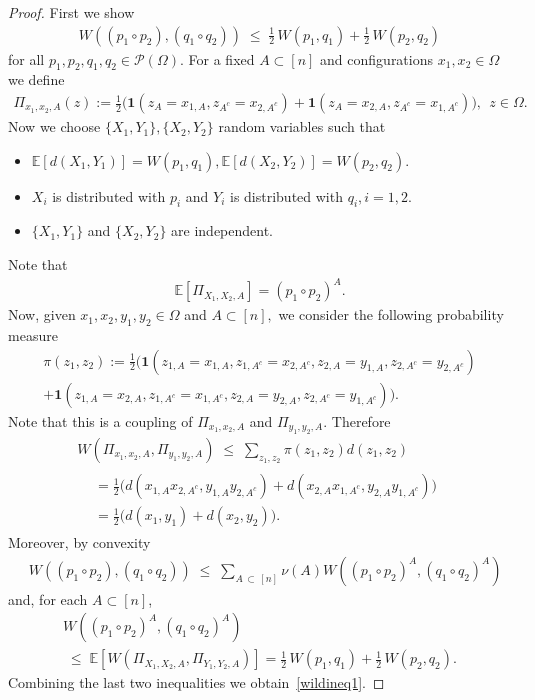 \documentclass[10pt,a4paper]{article}
\renewcommand{\leq}{\;\leqslant\;}
\newcommand{\Om}{\Omega}
\newcommand{\IND}{\mathbf{1}}
\newcommand{\cP}{\mathcal{P}}
\newcommand{\bbE}{\mathbb{E}}
\let\O=\Omega
\begin{document}
\begin{proof}
First we show
\begin{align}\label{wildineq1}
W\left((p_1 \circ p_2),(q_1 \circ q_2)\right)\leq \tfrac{1}{2}\,W\left(p_1,q_1\right) + \tfrac{1}{2}\,W\left(p_2,q_2\right)
\end{align}
for all $p_1,p_2,q_1,q_2 \in \cP(\O).$ For a fixed $A \subset [n]$ and configurations $x_1, x_2 \in \Om$ we define
\begin{align*}
\Pi_{x_1,x_2,A}(z) := \tfrac{1}{2}\big(\IND(z_A = x_{1,A}, z_{A^c}=x_{2,A^c})+\IND(z_A = x_{2,A}, z_{A^c}=x_{1,A^c})\big), \ \ z \in \Om.
\end{align*}
Now we choose $\{X_1,Y_1\}, \{X_2,Y_2\}$ random variables such that
\begin{itemize}
\item $\bbE[d(X_1,Y_1)] = W(p_1,q_1), \bbE[d(X_2,Y_2)] = W(p_2,q_2).$
\item $X_i$ is distributed with $p_i$ and $Y_i$ is distributed with $q_i, i=1,2.$
\item $\{X_1, Y_1\}$ and $\{X_2, Y_2\}$ are independent.
\end{itemize}
Note that
\begin{align}
\bbE\left[\Pi_{X_1,X_2,A}\right] = \left(p_1 \circ p_2\right)^A.
\end{align}
Now, given $x_1, x_2, y_1, y_2 \in \Om$ and $A \subset [n],$ we consider the following probability measure
\begin{multline*}
\pi(z_1,z_2):= \tfrac{1}{2}\big(\IND(z_{1,A}=x_{1,A}, z_{1,A^c}=x_{2,A^c},z_{2,A}=y_{1,A}, z_{2,A^c}=y_{2,A^c}) \\
 + \IND(z_{1,A}=x_{2,A},z_{1,A^c}=x_{1,A^c},z_{2,A}=y_{2,A}, z_{2,A^c}=y_{1,A^c})\big).
\end{multline*}
Note that this is a coupling of $\Pi_{x_1,x_2,A}$ and $\Pi_{y_1,y_2,A}.$ Therefore
\begin{multline} \label{wassineq}
W\left(\Pi_{x_1,x_2,A},\Pi_{y_1,y_2,A}\right)\leq \sum_{z_1,z_2}\pi(z_1,z_2)d(z_1,z_2)\\
\begin{aligned}
&=\tfrac{1}{2}\big(d(x_{1,A}x_{2,A^c},y_{1,A}y_{2,A^c})+d(x_{2,A}x_{1,A^c},y_{2,A}y_{1,A^c})\big) \\
&=\tfrac{1}{2}\big(d(x_1,y_1)+d(x_2,y_2)\big).
\end{aligned}
\end{multline}
Moreover, by convexity
\begin{align}
&W\left((p_1\circ p_2),(q_1 \circ q_2)\right) \leq \sum_{A\,\subset\,[n]}\nu(A)W\left((p_1\circ p_2)^A,(q_1 \circ q_2)^A\right)
\end{align}
and, for each $A \subset [n]$,
\begin{multline}\label{wildineq1overA}
W\left((p_1\circ p_2)^A,(q_1 \circ q_2)^A\right) \\
\leq \bbE\left[W\left(\Pi_{X_1,X_2,A},\Pi_{Y_1,Y_2,A}\right)\right] =\tfrac{1}{2}\,W(p_1,q_1) + \tfrac{1}{2}\,W(p_2,q_2).
\end{multline}
Combining the last two inequalities we obtain~\eqref{wildineq1}.


\end{proof}
\end{document}
